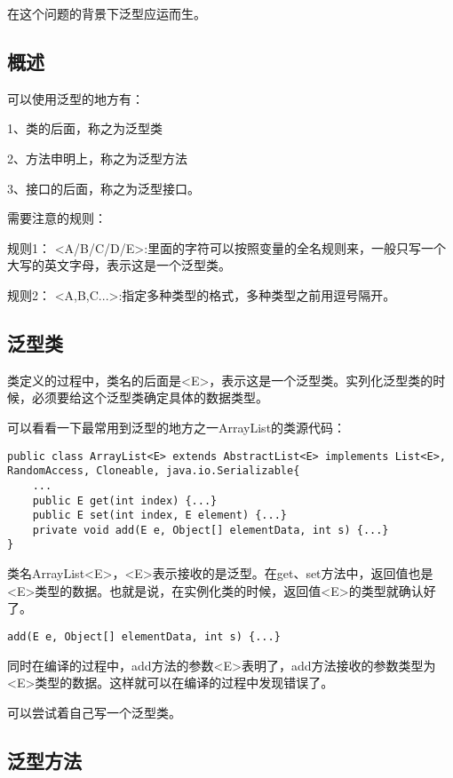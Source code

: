 
在这个问题的背景下泛型应运而生。


\subsection*{概述}
可以使用泛型的地方有：

1、类的后面，称之为泛型类 

2、方法申明上，称之为泛型方法 

3、接口的后面，称之为泛型接口。

需要注意的规则：

规则1：
<A/B/C/D/E>:里面的字符可以按照变量的全名规则来，一般只写一个大写的英文字母，表示这是一个泛型类。

规则2：
<A,B,C...>:指定多种类型的格式，多种类型之前用逗号隔开。

\subsection*{泛型类}

类定义的过程中，类名的后面是<E>，表示这是一个泛型类。实列化泛型类的时候，必须要给这个泛型类确定具体的数据类型。

可以看看一下最常用到泛型的地方之一ArrayList的类源代码：

\begin{lstlisting}[style = Java]
public class ArrayList<E> extends AbstractList<E> implements List<E>, RandomAccess, Cloneable, java.io.Serializable{
    ...
    public E get(int index) {...}
    public E set(int index, E element) {...}
    private void add(E e, Object[] elementData, int s) {...}
}
\end{lstlisting}

类名ArrayList<E>，<E>表示接收的是泛型。在get、set方法中，返回值也是<E>类型的数据。也就是说，在实例化类的时候，返回值<E>的类型就确认好了。

\begin{lstlisting}[style = Java]
    add(E e, Object[] elementData, int s) {...}
\end{lstlisting}

同时在编译的过程中，add方法的参数<E>表明了，add方法接收的参数类型为<E>类型的数据。这样就可以在编译的过程中发现错误了。


可以尝试着自己写一个泛型类。










\subsection*{泛型方法}
